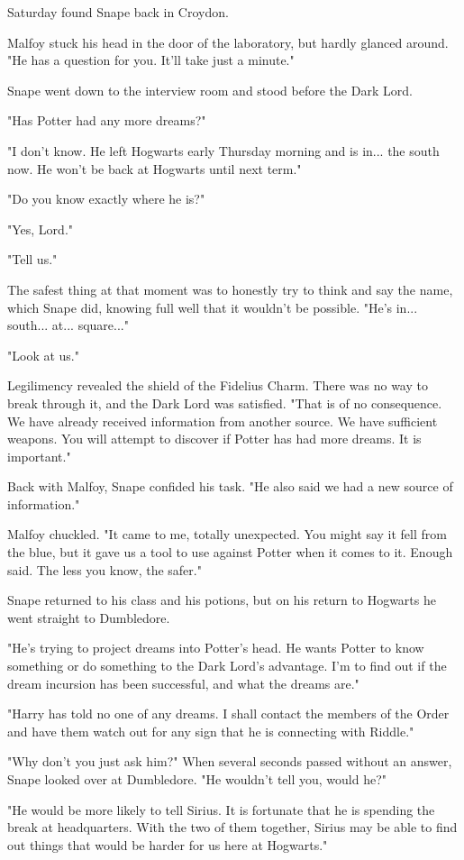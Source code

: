 Saturday found Snape back in Croydon.

Malfoy stuck his head in the door of the laboratory, but hardly glanced around. "He has a question for you. It'll take just a minute."

Snape went down to the interview room and stood before the Dark Lord.

"Has Potter had any more dreams?"

"I don't know. He left Hogwarts early Thursday morning and is in... the south now. He won't be back at Hogwarts until next term."

"Do you know exactly where he is?"

"Yes, Lord."

"Tell us."

The safest thing at that moment was to honestly try to think and say the name, which Snape did, knowing full well that it wouldn't be possible. "He's in... south... at... square..."

"Look at us."

Legilimency revealed the shield of the Fidelius Charm. There was no way to break through it, and the Dark Lord was satisfied. "That is of no consequence. We have already received information from another source. We have sufficient weapons. You will attempt to discover if Potter has had more dreams. It is important."

Back with Malfoy, Snape confided his task. "He also said we had a new source of information."

Malfoy chuckled. "It came to me, totally unexpected. You might say it fell from the blue, but it gave us a tool to use against Potter when it comes to it. Enough said. The less you know, the safer."

Snape returned to his class and his potions, but on his return to Hogwarts he went straight to Dumbledore.

"He's trying to project dreams into Potter's head. He wants Potter to know something or do something to the Dark Lord's advantage. I'm to find out if the dream incursion has been successful, and what the dreams are."

"Harry has told no one of any dreams. I shall contact the members of the Order and have them watch out for any sign that he is connecting with Riddle."

"Why don't you just ask him?" When several seconds passed without an answer, Snape looked over at Dumbledore. "He wouldn't tell you, would he?"

"He would be more likely to tell Sirius. It is fortunate that he is spending the break at headquarters. With the two of them together, Sirius may be able to find out things that would be harder for us here at Hogwarts."

